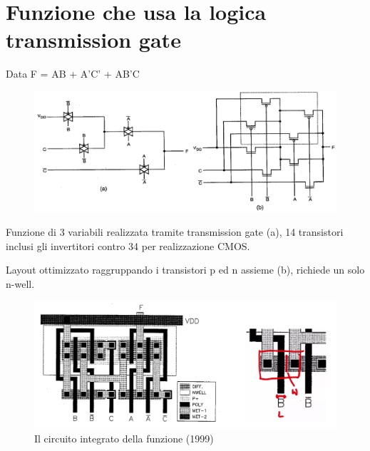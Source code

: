 \newpage
\section{Funzione che usa la logica transmission gate}

Data F = AB + A'C' + AB'C

    
\begin{figure}[htbp]
    \centering
    \includegraphics[width=0.7\linewidth]{img/trans_circ_integrato.png}
    
    
\end{figure}

Funzione di 3 variabili realizzata tramite
transmission gate (a), 14 transistori inclusi gli invertitori contro 34 per realizzazione CMOS.

Layout ottimizzato raggruppando i transistori
p ed n assieme (b), richiede un solo n-well.




\begin{figure}[htbp]
    \centering
    \includegraphics[width=0.75\linewidth]{img/transistore_circ_intergatas.png}
    \caption{Il circuito integrato della funzione (1999)}
    
\end{figure}

